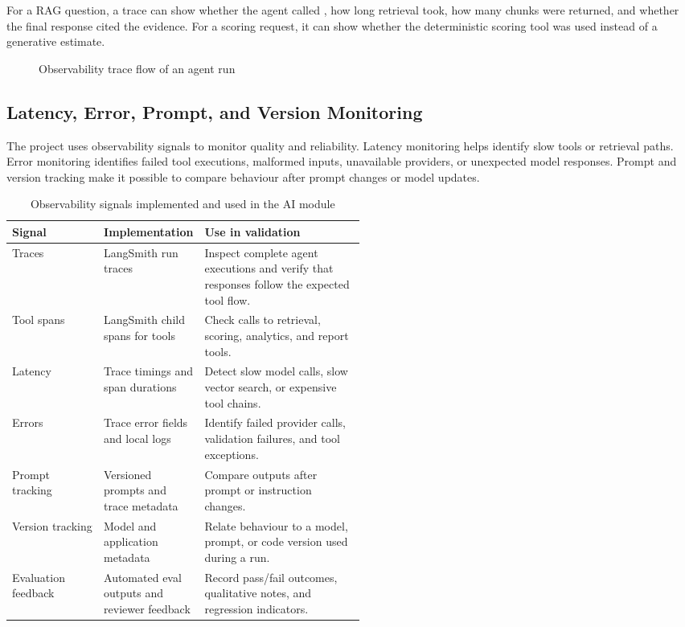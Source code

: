 For a RAG question, a trace can show whether the agent called , how long retrieval took, how many chunks were returned, and whether the final response cited the evidence. For a scoring request, it can show whether the deterministic scoring tool was used instead of a generative estimate.

\begin{figure}[htbp]
  \caption{Observability trace flow of an agent run}
  \label{fig:chapter7-observability-flow}
\end{figure}

\subsection{Latency, Error, Prompt, and Version Monitoring}
\label{subsec:chapter7-observability-signals}

The project uses observability signals to monitor quality and reliability. Latency monitoring helps identify slow tools or retrieval paths. Error monitoring identifies failed tool executions, malformed inputs, unavailable providers, or unexpected model responses. Prompt and version tracking make it possible to compare behaviour after prompt changes or model updates.

\begin{table}[H]
  \centering
  \caption{Observability signals implemented and used in the AI module}
  \label{tab:chapter7-observability-signals}
  \begin{tabularx}{\linewidth}{>{\raggedright\arraybackslash}p{0.26\linewidth}>{\raggedright\arraybackslash}p{0.25\linewidth}X}
    \toprule
    \textbf{Signal} & \textbf{Implementation} & \textbf{Use in validation} \\
    \midrule
    Traces & LangSmith run traces & Inspect complete agent executions and verify that responses follow the expected tool flow. \\
    Tool spans & LangSmith child spans for tools & Check calls to retrieval, scoring, analytics, and report tools. \\
    Latency & Trace timings and span durations & Detect slow model calls, slow vector search, or expensive tool chains. \\
    Errors & Trace error fields and local logs & Identify failed provider calls, validation failures, and tool exceptions. \\
    Prompt tracking & Versioned prompts and trace metadata & Compare outputs after prompt or instruction changes. \\
    Version tracking & Model and application metadata & Relate behaviour to a model, prompt, or code version used during a run. \\
    Evaluation feedback & Automated eval outputs and reviewer feedback & Record pass/fail outcomes, qualitative notes, and regression indicators. \\
    \bottomrule
  \end{tabularx}
\end{table}

